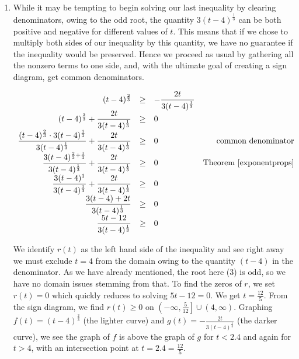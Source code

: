 \documentclass{ximera}
\begin{document}
\begin{ex}
\begin{enumerate}
\item While it may be tempting to begin solving  our last inequality by clearing denominators, owing to the odd root, the quantity $3(t-4)^{\frac{1}{3}}$ can be both positive and negative for different values of $t$.  This means that if we chose to multiply both sides of our inequality by this quantity, we have no guarantee if the inequality would be preserved.  Hence we proceed as usual by gathering all the nonzero terms to one side, and,  with the ultimate goal of creating a sign diagram, get common denominators.  

\[ \begin{array}{rclr}

(t-4)^{\frac{2}{3}} & \geq &  - \dfrac{2t}{3(t-4)^{\frac{1}{3}}} & \\


(t-4)^{\frac{2}{3}} + \dfrac{2t}{3(t-4)^{\frac{1}{3}}}  & \geq & 0 \\

\dfrac{ (t-4)^{\frac{2}{3}} \cdot 3(t-4)^{\frac{1}{3}} }{3(t-4)^{\frac{1}{3}}}  + \dfrac{2t}{3(t-4)^{\frac{1}{3}}} & \geq & 0 & \text{common denominator} \\

\dfrac{3(t-4)^{\frac{2}{3}+\frac{1}{3}}}{3(t-4)^{\frac{1}{3}}}  + \dfrac{2t}{3(t-4)^{\frac{1}{3}}} & \geq & 0 & \text{Theorem \ref{exponentprops}} \\ 

\dfrac{3(t-4)^{1}}{3(t-4)^{\frac{1}{3}}}  + \dfrac{2t}{3(t-4)^{\frac{1}{3}}} & \geq & 0 & \\ 

\dfrac{3(t-4) + 2t}{3(t-4)^{\frac{1}{3}}}   & \geq & 0 & \\ 

\dfrac{5t-12}{3(t-4)^{\frac{1}{3}}}   & \geq & 0 & \\ 

\end{array} \]

We identify $r(t)$ as the left hand side of the inequality and see right away we must exclude $t=4$ from the domain owing to the quantity $(t-4)$ in the denominator.  As we have already mentioned, the root here ($3$) is odd, so we have no domain issues stemming from that.  To find the zeros of $r$, we set $r(t) = 0$ which quickly reduces to solving $5t-12 = 0$.  We get $t = \frac{12}{5}$.    From the sign diagram, we find $r(t) \geq 0$ on $\left(-\infty, \frac{5}{12} \right] \cup (4, \infty)$.  Graphing $f(t) = (t-4)^{\frac{2}{3}}$ (the lighter curve) and $g(t) = -\frac{2t}{3(t-4)^{\frac{1}{3}}}$ (the darker curve), we see the graph of $f$ is above the graph of $g$ for $t < 2.4$ and again for $t > 4$, with an intersection point at $t=2.4 = \frac{12}{5}$. 


\end{enumerate}
\end{ex}
\end{document}
